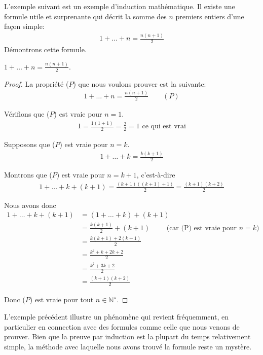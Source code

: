 \documentclass[]{book}
\theoremstyle{definition}
\theoremstyle{definition}
\theoremstyle{definition}
\theoremstyle{remark}
\let\BeginKnitrBlock\begin \let\EndKnitrBlock\end
\begin{document}
L'exemple suivant est un exemple d'induction mathématique. Il existe une formule utile et surprenante qui décrit la somme des \(n\) premiers entiers d'une façon simple:
\begin{align*}
        1+\ldots+n=\frac{n(n+1)}{2}
    \end{align*}
Démontrons cette formule.

\BeginKnitrBlock{theorem}
\protect\hypertarget{thm:unnamed-chunk-247}{}{\label{thm:unnamed-chunk-247} }\(1+\ldots+n=\frac{n(n+1)}{2}\).
\EndKnitrBlock{theorem}

\BeginKnitrBlock{proof}
{}La propriété (\(P\)) que nous voulons prouver est la suivante:
\begin{align*}
        1+\ldots+n=\frac{n(n+1)}{2} \qquad (P)
    \end{align*}

Vérifions que (\(P\)) est vraie pour \(n=1\).
\begin{align*}
        1=\frac{1(1+1)}{2}=\frac{2}{2}=1 \text{  ce qui est vrai}
    \end{align*}

Supposons que (\(P\)) est vraie pour \(n=k\).
\begin{align*}
        1+\ldots+k=\frac{k(k+1)}{2}
    \end{align*}

Montrons que (\(P\)) est vraie pour \(n=k+1\), c'est-à-dire
\begin{align*}
        1+\ldots+k+(k+1)=\frac{(k+1)((k+1)+1)}{2}=\frac{(k+1)(k+2)}{2}
    \end{align*}

Nous avons donc
\begin{align*}
        1+\ldots+k+(k+1) &= (1+\ldots+k)+(k+1) \\
                         &= \frac{k(k+1)}{2} + (k+1) \qquad\text{\ (car (P) est vraie pour $n=k$)}\\
                         &= \frac{k(k+1)+2(k+1)}{2} \\
                         &= \frac{k^2+k+2k+2}{2} \\
                         &= \frac{k^2+3k+2}{2} \\
                         &= \frac{(k+1)(k+2)}{2}
    \end{align*}

Donc (\(P\)) est vraie pour tout \(n \in \mathbb{N}^{\star}\).
\EndKnitrBlock{proof}

L'exemple précédent illustre un phénomène qui revient fréquemment, en particulier en connection avec des formules comme celle que nous venons de prouver. Bien que la preuve par induction est la plupart du temps relativement simple, la méthode avec laquelle nous avons trouvé la formule reste un mystère.
\end{document}
